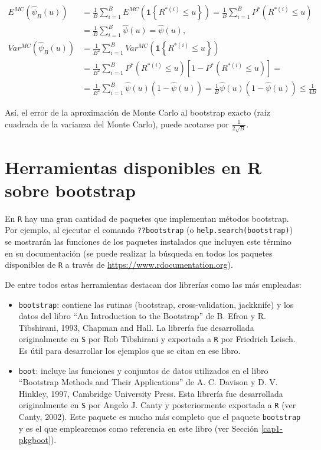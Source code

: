 \documentclass[]{book}
\theoremstyle{definition}
\theoremstyle{definition}
\theoremstyle{definition}
\theoremstyle{remark}
\begin{document}
\[\begin{aligned}
E^{MC}\left( \hat{\psi}_{B}\left( u \right) \right) &= \frac{1}{B}
\sum_{i=1}^{B}E^{MC}\left( \mathbf{1}\left\{ R^{\ast (i)}\leq
u\right\} \right) =\frac{1}{B}\sum_{i=1}^{B}P^{\ast}\left( R^{\ast \left(
i \right)}\leq u \right) \\
&= \frac{1}{B}\sum_{i=1}^{B}\hat{\psi}\left( u \right) =\hat{\psi}\left(
u \right), \\
Var^{MC}\left( \hat{\psi}_{B}\left( u \right) \right) &= \frac{1}{B^2}
\sum_{i=1}^{B}Var^{MC}\left( \mathbf{1}\left\{ R^{\ast (i)}\leq
u\right\} \right) \\
&= \frac{1}{B^2}\sum_{i=1}^{B}P^{\ast}\left( R^{\ast (i)
}\leq u \right) \left[ 1-P^{\ast}\left( R^{\ast (i)}\leq
u \right) \right] = \\
&= \frac{1}{B^2}\sum_{i=1}^{B}\hat{\psi}\left( u \right) \left( 1-\hat{\psi}
\left( u \right) \right) =\frac{1}{B}\hat{\psi}\left( u \right) \left( 1-\hat{
\psi}\left( u \right) \right) \leq \frac{1}{4B}
\end{aligned}\]

Así, el error de la aproximación de Monte Carlo al bootstrap exacto
(raíz cuadrada de la varianza del Monte Carlo), puede acotarse por
\(\frac{1}{2\sqrt{B}}\).

\section{Herramientas disponibles en R sobre
bootstrap}\label{cap1-paquetes}

En \texttt{R} hay una gran cantidad de paquetes que implementan métodos
bootstrap. Por ejemplo, al ejecutar el comando \texttt{??bootstrap} (o
\texttt{help.search(\textquotesingle{}bootstrap\textquotesingle{})}) se
mostrarán las funciones de los paquetes instalados que incluyen este
término en su documentación (se puede realizar la búsqueda en todos los
paquetes disponibles de \texttt{R} a través de
\url{https://www.rdocumentation.org}).

De entre todos estas herramientas destacan dos librerías como las más
empleadas:

\begin{itemize}
\item
  \texttt{bootstrap}: contiene las rutinas (bootstrap, cross-validation,
  jackknife) y los datos del libro ``An Introduction to the Bootstrap''
  de B. Efron y R. Tibshirani, 1993, Chapman and Hall. La librería fue
  desarrollada originalmente en \texttt{S} por Rob Tibshirani y
  exportada a \texttt{R} por Friedrich Leisch. Es útil para desarrollar
  los ejemplos que se citan en ese libro.
\item
  \texttt{boot}: incluye las funciones y conjuntos de datos utilizados
  en el libro ``Bootstrap Methods and Their Applications'' de A. C.
  Davison y D. V. Hinkley, 1997, Cambridge University Press. Esta
  librería fue desarrollada originalmente en \texttt{S} por Angelo J.
  Canty y posteriormente exportada a \texttt{R} (ver Canty, 2002). Este
  paquete es mucho más completo que el paquete \texttt{bootstrap} y es
  el que emplearemos como referencia en este libro (ver Sección
  \ref{cap1-pkgboot}).
\end{itemize}
\end{document}
